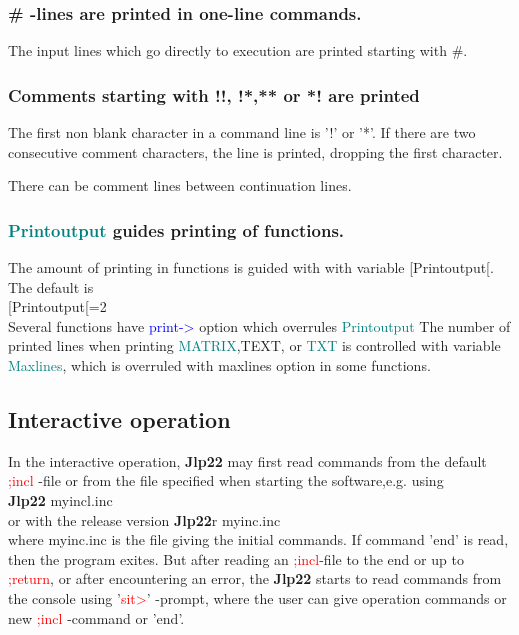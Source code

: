 {\subsubsection{\# -lines are printed in one-line commands.} 
\label{printcommand} 
The input lines which go directly to execution are printed starting with \#. 
\subsubsection{Comments starting with !!, !*,** or *! are printed} 
\label{printcom} 
The first non blank character in a command line is '!' or '*'. 
If there are two consecutive comment characters, the line is printed, dropping the first 
character. 
\begin{note} 
There can be comment lines between continuation lines. 
\end{note} 
\subsubsection{\textcolor{teal}{Printoutput} guides printing of functions.} 
\label{printoutput} 
The amount of printing in functions is guided with with variable [Printoutput[. 
The default is \\ 
[Printoutput[=2\\ 
Several functions have \textcolor{blue}{print->} option which overrules \textcolor{teal}{Printoutput} 
The number of printed lines when printing \textcolor{teal}{MATRIX},TEXT, or \textcolor{teal}{TXT} is controlled with 
variable \textcolor{teal}{Maxlines}, which is overruled with maxlines option in some functions. 
\subsection{Interactive operation} 
\label{interactive} 
In the interactive operation, \textbf{Jlp22} may first read commands from the 
default \textcolor{Red}{;incl} -file or from the file specified when starting the software,e.g. using\\ 
\textbf{Jlp22} myincl.inc \\ 
or with the release version 
\textbf{Jlp22}r myinc.inc\\ 
where myinc.inc is the file giving the initial commands. If command 'end' is read, then the program exites. 
But after reading an \textcolor{Red}{;incl}-file to the end or up to \textcolor{Red}{;return}, or after encountering an error, the \textbf{Jlp22} starts 
to read commands from the console using '\textcolor{Red}{sit>}' -prompt, where the user can give 
operation commands or new \textcolor{Red}{;incl} -command or 'end'. 
 
}
